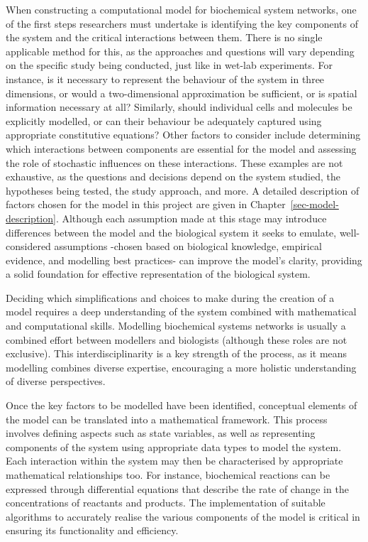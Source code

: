 \documentclass[
  11pt,
  letterpaper,
]{scrreprt}
\begin{document}
When constructing a computational model for biochemical system networks,
one of the first steps researchers must undertake is identifying the key
components of the system and the critical interactions between them.
There is no single applicable method for this, as the approaches and
questions will vary depending on the specific study being conducted,
just like in wet-lab experiments. For instance, is it necessary to
represent the behaviour of the system in three dimensions, or would a
two-dimensional approximation be sufficient, or is spatial information
necessary at all? Similarly, should individual cells and molecules be
explicitly modelled, or can their behaviour be adequately captured using
appropriate constitutive equations? Other factors to consider include
determining which interactions between components are essential for the
model and assessing the role of stochastic influences on these
interactions. These examples are not exhaustive, as the questions and
decisions depend on the system studied, the hypotheses being tested, the
study approach, and more. A detailed description of factors chosen for
the model in this project are given in
Chapter~\ref{sec-model-description}. Although each assumption made at
this stage may introduce differences between the model and the
biological system it seeks to emulate, well-considered assumptions
-chosen based on biological knowledge, empirical evidence, and modelling
best practices- can improve the model's clarity, providing a solid
foundation for effective representation of the biological system.

Deciding which simplifications and choices to make during the creation
of a model requires a deep understanding of the system combined with
mathematical and computational skills. Modelling biochemical systems
networks is usually a combined effort between modellers and biologists
(although these roles are not exclusive). This interdisciplinarity is a
key strength of the process, as it means modelling combines diverse
expertise, encouraging a more holistic understanding of diverse
perspectives.

Once the key factors to be modelled have been identified, conceptual
elements of the model can be translated into a mathematical framework.
This process involves defining aspects such as state variables, as well
as representing components of the system using appropriate data types to
model the system. Each interaction within the system may then be
characterised by appropriate mathematical relationships too. For
instance, biochemical reactions can be expressed through differential
equations that describe the rate of change in the concentrations of
reactants and products. The implementation of suitable algorithms to
accurately realise the various components of the model is critical in
ensuring its functionality and efficiency.
\end{document}
